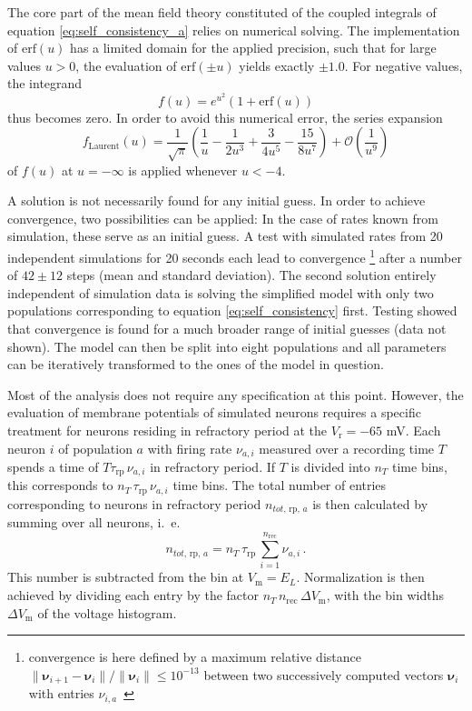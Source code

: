 The core part of the mean field theory constituted of the 
coupled integrals of equation \eqref{eq:self_consistency_a} relies on numerical
solving. The implementation of $\text{erf}(u)$ has a limited domain for the applied 
precision, such that for large values $u > 0$, the evaluation of 
$\text{erf}(\pm u)$ yields exactly $\pm 1.0$. For negative values, the integrand 
\begin{equation}
    f(u) = e^{u^2} \left(1 + \text{erf}(u)\right)
    \label{eq:integrand}
\end{equation}
thus becomes zero. In order to avoid this 
numerical error, the series expansion 
\begin{equation}
    f_\text{Laurent}(u) = 
        \frac{1}{\sqrt{\pi}} 
        \left( \frac{1}{u} - \frac{1}{2u^3} + \frac{3}{4u^5} - \frac{15}{8u^7} \right) +  
        \mathcal{O}\left( \frac{1}{u^9} \right) 
    \label{eq:expand_integrand}
\end{equation}
of $f(u)$ at $u = -\infty$ is applied whenever $u < -4$. 

A solution is not necessarily found for any initial guess. In order to achieve convergence, two possibilities 
can be applied: In the case of rates known from simulation, these serve as an initial guess. 
A test with simulated rates from 20 independent simulations for 20 seconds each lead to convergence%
\footnote{convergence is here defined by a maximum relative distance 
    $\|\boldsymbol\nu_{i + 1} - \boldsymbol\nu_i\| / \|\boldsymbol\nu_i\| \le 10^{-13}$ between two 
    successively computed vectors $\boldsymbol\nu_i$ with entries $\nu_{i, a}$~\cite{scipy}} %
after a number of $42 \pm 12$ steps (mean and standard deviation). 
The second solution entirely independent of simulation data is solving the simplified model 
with only two populations corresponding to equation \eqref{eq:self_consistency} first.
Testing showed that convergence is found for a much broader range of initial guesses (data not shown).
The model can then be split 
into eight populations and all parameters can be iteratively transformed to the ones of the 
model in question. 

Most of the analysis does not require any specification at this point. 
However, the evaluation of membrane potentials of simulated neurons requires a specific treatment 
for neurons residing in refractory period at the $V_\text{r} = -65$ mV. 
Each neuron $i$ of population $a$ with firing rate $\nu_{a, i}$ measured over 
a recording time $T$ spends a time of \:$T \tau_\text{rp} \,\nu_{a, i}$\: in refractory 
period. If $T$ is divided into $n_T$ time bins, this corresponds to 
$n_T \, \tau_\text{rp} \,\nu_{a, i}$ time bins. The total number of entries 
corresponding to neurons in refractory period $n_{tot, \,\text{rp}, \,a}$ is then 
calculated by summing over all neurons, i.~e.
\begin{equation}
    n_{tot, \,\text{rp}, \,a}
        = n_T \, \tau_\text{rp} \,\sum_{i = 1}^{n_\text{rec}}\nu_{a, i} \, .
    \label{eq:n_tot_rp}
\end{equation}
This number is subtracted from the bin at $V_\text{m} = E_L$. Normalization is then
achieved by dividing each entry by the factor $n_T \, n_\text{rec} \, \Delta V_\text{m}$, 
with the bin widths $\Delta V_\text{m}$ of the voltage histogram.

